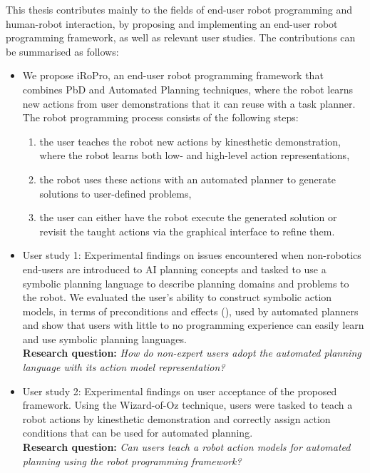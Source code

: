 This thesis contributes mainly to the fields of end-user robot programming and human-robot interaction, by proposing and implementing an end-user robot programming framework, as well as relevant user studies.
The contributions can be summarised as follows:
\begin{itemize}
	\item {We propose iRoPro, an end-user robot programming framework that combines PbD and Automated Planning techniques, where the robot learns new actions from user demonstrations that it can reuse with a task planner. %
	The robot programming process consists of the following steps:
	\begin{enumerate}
		\item the user teaches the robot new actions by kinesthetic demonstration, where the robot learns both low- and high-level action representations,
		\item the robot uses these actions with an automated planner to generate solutions to user-defined problems,
		\item the user can either have the robot execute the generated solution or revisit the taught actions via the graphical interface to refine them.
	\end{enumerate}
}

    \item {User study 1: Experimental findings on issues encountered when non-robotics end-users are introduced to AI planning concepts and tasked to use a symbolic planning language to describe planning domains and problems to the robot. 
    	We evaluated the user's ability to construct symbolic action models, in terms of preconditions and effects (), used by automated planners and show that users with little to no programming experience can easily learn and use symbolic planning languages.\\%
    	\textbf{Research question:} \textit{How do non-expert users adopt the automated planning language with its action model representation?}}

    \item {User study 2: Experimental findings on user acceptance of the proposed framework. Using the Wizard-of-Oz technique, users were tasked to teach a robot actions by kinesthetic demonstration and correctly assign action conditions that can be used for automated planning.\\
    	\textbf{Research question:} \textit{Can users teach a robot action models for automated planning using the robot programming framework?}}


\end{itemize}
